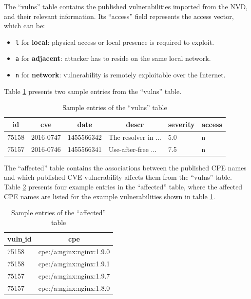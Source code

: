 \documentclass[a4paper,12pt]{article}
\begin{document}
	The ``vulns'' table contains the published vulnerabilities imported from the NVD, and their relevant information. Its ``access'' field represents the access vector, which can be:
	
	\begin{itemize}
		\item \texttt{l} for \textbf{local}: physical access or local presence is required to exploit.
		\item \texttt{a} for \textbf{adjacent}: attacker has to reside on the same local network.
		\item \texttt{n} for \textbf{network}: vulnerability is remotely exploitable over the Internet.
	\end{itemize}
	
	Table \ref{dbvulns} presents two sample entries from the ``vulns'' table.
	
	\begin{table}[H]
		\centering
		\begin{tabular}{|l|l|l|l|l|l|}
			\hline
			\multicolumn{1}{|c|}{\textbf{id}} & \multicolumn{1}{c|}{\textbf{cve}} & \multicolumn{1}{c|}{\textbf{date}} & \multicolumn{1}{c|}{\textbf{descr}} & \multicolumn{1}{c|}{\textbf{severity}} & \multicolumn{1}{c|}{\textbf{access}} \\ \hline
			75158 & 2016-0747 & 1455566342 & The resolver in ... & 5.0 & n \\
			75157 & 2016-0746 & 1455566341 & Use-after-free ... & 7.5 & n \\ \hline
		\end{tabular}
		\caption{Sample entries of the ``vulns'' table}
		\label{dbvulns}
	\end{table}
	
	The ``affected'' table contains the associations between the published CPE names and which published CVE vulnerability affects them from the ``vulns'' table. Table \ref{dbaffected} presents four example entries in the ``affected'' table, where the affected CPE names are listed for the example vulnerabilities shown in table \ref{dbvulns}.
	
	\begin{table}[H]
		\centering
		\begin{tabular}{|l|l|}
			\hline
			\multicolumn{1}{|c|}{\textbf{vuln\underline{ }id}} & \multicolumn{1}{c|}{\textbf{cpe}} \\ \hline
			75158 & cpe:/a:nginx:nginx:1.9.0 \\
			75158 & cpe:/a:nginx:nginx:1.9.1 \\
			75157 & cpe:/a:nginx:nginx:1.9.7 \\
			75157 & cpe:/a:nginx:nginx:1.8.0 \\ \hline
		\end{tabular}
		\caption{Sample entries of the ``affected'' table}
		\label{dbaffected}
	\end{table}
	
\end{document}
